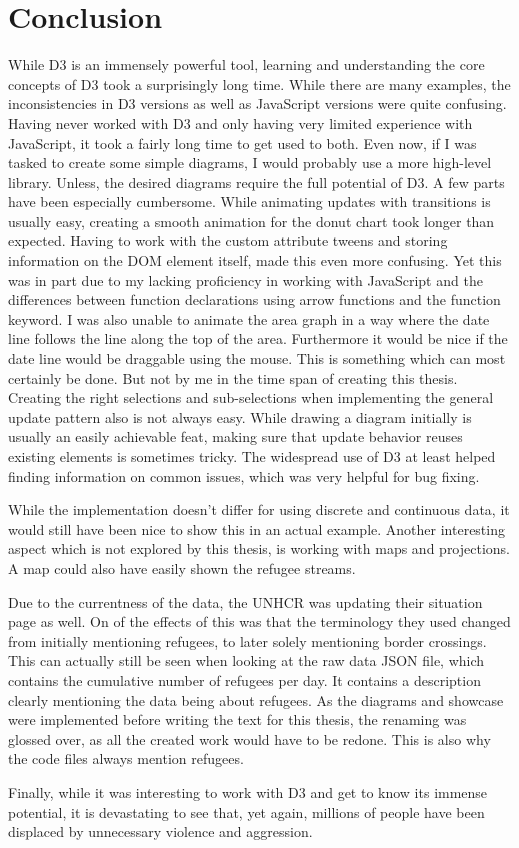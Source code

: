 \chapter{Conclusion}\label{sec:conclusion}

While D3 is an immensely powerful tool, learning and understanding the core concepts of D3 took a surprisingly long time. While there are many examples, the inconsistencies in D3 versions as well as JavaScript versions were quite confusing. Having never worked with D3 and only having very limited experience with JavaScript, it took a fairly long time to get used to both.
Even now, if I was tasked to create some simple diagrams, I would probably use a more high-level library. Unless, the desired diagrams require the full potential of D3.
A few parts have been especially cumbersome. While animating updates with transitions is usually easy, creating a smooth animation for the donut chart took longer than expected. Having to work with the custom attribute tweens and storing information on the DOM element itself, made this even more confusing. Yet this was in part due to my lacking proficiency in working with JavaScript and the differences between function declarations using arrow functions and the function keyword. I was also unable to animate the area graph in a way where the date line follows the line along the top of the area. Furthermore it would be nice if the date line would be draggable using the mouse. This is something which can most certainly be done. But not by me in the time span of creating this thesis. Creating the right selections and sub-selections when implementing the general update pattern also is not always easy. While drawing a diagram initially is usually an easily achievable feat, making sure that update behavior reuses existing elements is sometimes tricky. The widespread use of D3 at least helped finding information on common issues, which was very helpful for bug fixing.

While the implementation doesn't differ for using discrete and continuous data, it would still have been nice to show this in an actual example. Another interesting aspect which is not explored by this thesis, is working with maps and projections. A map could also have easily shown the refugee streams.

Due to the currentness of the data, the UNHCR was updating their situation page as well. On of the effects of this was that the terminology they used changed from initially mentioning refugees, to later solely mentioning border crossings. This can actually still be seen when looking at the raw data JSON file, which contains the cumulative number of refugees per day. It contains a description clearly mentioning the data being about refugees. As the diagrams and showcase were implemented before writing the text for this thesis, the renaming was glossed over, as all the created work would have to be redone. This is also why the code files always mention refugees. 

Finally, while it was interesting to work with D3 and get to know its immense potential, it is devastating to see that, yet again, millions of people have been displaced by unnecessary violence and aggression.
